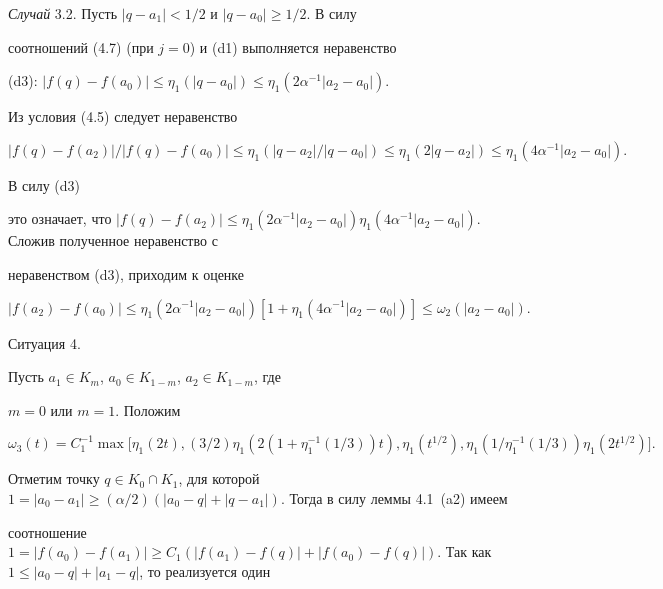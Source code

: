 \begin{pf}
{\it Случай} 3.2. Пусть $|q-a_1| < 1/2$ и $|q-a_0| \geq 1/2$. В силу 


соотношений (4.7) (при $j=0$) и (d1) выполняется неравенство 





(d3): $|f(q)-f (a_0)| \leq \eta_1(|q-a_0|)\leq\eta_1(2\alpha^{-1}|a_2-a_0|)$.





\noindent{}Из условия (4.5) следует неравенство 


$$


|f(q)-f(a_2)|/|f(q)-f(a_0)| \leq \eta_1(|q-a_2|/|q-a_0|) \leq 


\eta_1(2|q-a_2|) \leq \eta_1(4\alpha^{-1}|a_2-a_0|).


$$


В силу (d3) 


это означает, что $|f(q)-f (a_2)| \leq \eta_1(2\alpha^{-1}|a_2-a_0|) 


\eta_1(4\alpha^{-1}|a_2-a_0|)$. Сложив полученное неравенство с 


неравенством (d3), приходим к оценке


$$


|f(a_2)-f(a_0)| \leq \eta_1(2\alpha^{-1}|a_2-a_0|)[1+


\eta_1(4\alpha^{-1}|a_2-a_0|)] \leq \omega_2(|a_2-a_0|). 


$$





Ситуация 4.


Пусть $a_1 \in K_m$, $a_0 \in K_{1-m}$, $a_2 \in K_{1-m}$, где 


$m=0$ или $m=1$. Положим


$$


\omega_3(t)=


C_1^{-1} \max \big[ \eta_1(2t), (3/2)\eta_1(2(1+


\eta_1^{-1}(1/3))t), \eta_1(t^{1/2}), \eta_1(1/\eta_1^{-1}(1/3))


\eta_1(2t^{1/2}) \big].


$$ 


Отметим точку $q \in K_0\cap K_1$, для которой $1=|a_0-a_1| \geq 


(\alpha/2)(|a_0-q|+|q-a_1|)$. Тогда в силу леммы 4.1~(a2) имеем 


соотношение $1=|f(a_0)-f (a_1)| \geq C_1(|f(a_1)-f(q)|+|f(a_0)-


f(q)|)$. Так как $1 \leq |a_0-q|+|a_1-q|$, то реализуется один 



\end{pf}
